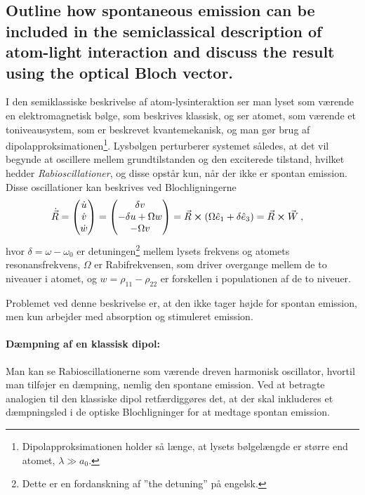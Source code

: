 \subsection{Outline how spontaneous emission can be included in the semiclassical description of atom-light interaction and discuss the result using the optical Bloch vector.}


I den semiklassiske beskrivelse af atom-lysinteraktion ser man lyset som værende en elektromagnetisk bølge, som beskrives klassisk, og ser atomet, som værende et toniveausystem, som er beskrevet kvantemekanisk, og man gør brug af dipolapproksimationen\footnote{Dipolapproksimationen holder så længe, at lysets bølgelængde er større end atomet, $\lambda \gg a_0$.}. Lysbølgen perturberer systemet således, at det vil begynde at oscillere mellem grundtilstanden og den exciterede tilstand, hvilket hedder \emph{Rabioscillationer}, og disse opstår kun, når der ikke er spontan emission. Disse oscillationer kan beskrives ved Blochligningerne
\begin{align}
    \Dot{\Vec{R}} &=
        \begin{pmatrix}
            \Dot{u} \\
            \Dot{v} \\
            \Dot{w}
        \end{pmatrix}
    =
        \begin{pmatrix}
            \delta v \\
            -\delta u + \Omega w \\
            -\Omega v
        \end{pmatrix}
    = \Vec{R} \cross \left(\Omega\Hat{e}_1 + \delta\Hat{e}_3\right)
    = \Vec{R} \cross \Vec{W} \: ,
\end{align}
hvor $\delta = \omega - \omega_0$ er detuningen\footnote{Dette er en fordanskning af ''the detuning'' på engelsk.} mellem lysets frekvens og atomets resonansfrekvens, $\Omega$ er Rabifrekvensen, som driver overgange mellem de to niveauer i atomet, og $w = \rho_{11} - \rho_{22}$ er forskellen i populationen af de to niveuer.

Problemet ved denne beskrivelse er, at den ikke tager højde for spontan emission, men kun arbejder med absorption og stimuleret emission.


\paragraph{Dæmpning af en klassisk dipol:} Man kan se Rabioscillationerne som værende dreven harmonisk oscillator, hvortil man tilføjer en dæmpning, nemlig den spontane emission. Ved at betragte analogien til den klassiske dipol retfærdiggøres det, at der skal inkluderes et dæmpningsled i de optiske Blochligninger for at medtage spontan emission.

